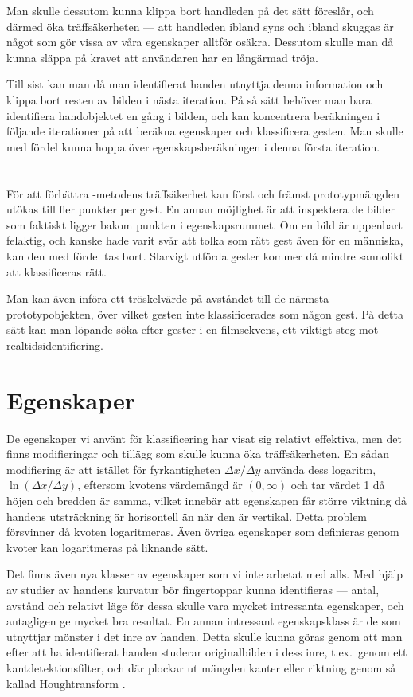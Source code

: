 \documentclass[../rapport_MVEX01-11-05]{subfiles}
\begin{document}
Man skulle dessutom kunna klippa bort handleden på det sätt
 föreslår, och därmed öka träffsäkerheten --- att
handleden ibland syns och ibland skuggas är något som gör vissa av våra
egenskaper alltför osäkra. Dessutom skulle man då kunna släppa på kravet
att användaren har en långärmad tröja.

Till sist kan man då man identifierat handen utnyttja denna information och
klippa bort resten av bilden i nästa iteration. På så sätt behöver man bara
identifiera handobjektet en gång i bilden, och kan koncentrera beräkningen
i följande iterationer på att beräkna egenskaper och klassificera gesten.
Man skulle med fördel kunna hoppa över egenskapsberäkningen i denna första
iteration.

\section{\knn}
För att förbättra \knn-metodens träffsäkerhet kan först och
främst prototypmängden utökas till fler punkter per gest. En annan
möjlighet är att inspektera de bilder som faktiskt ligger bakom
punkten i egenskapsrummet. Om en bild är uppenbart felaktig, och kanske hade varit
svår att tolka som rätt gest även för en människa, kan den med fördel tas bort.
Slarvigt utförda gester kommer då mindre sannolikt att
klassificeras rätt.

Man kan även införa ett tröskelvärde på avståndet till de närmsta
prototypobjekten, över vilket gesten inte klassificerades som någon
gest. På detta sätt kan man löpande söka efter gester
i en filmsekvens, ett viktigt steg mot
realtidsidentifiering.

\section{Egenskaper}
De egenskaper vi använt för klassificering har visat sig relativt
effektiva, men det finns modifieringar och tillägg som skulle kunna
öka träffsäkerheten.
En sådan modifiering är att istället för fyrkantigheten $\Delta
x/\Delta y$ använda dess logaritm, $\ln(\Delta x/\Delta
y)$, eftersom kvotens värdemängd är $(0,\infty)$ och tar värdet 1 då
höjen och bredden är samma, vilket innebär att egenskapen får större
viktning då handens utsträckning är horisontell än när den är vertikal. Detta problem
försvinner då kvoten logaritmeras. Även övriga egenskaper som
definieras genom kvoter kan logaritmeras på liknande sätt.

Det finns även nya klasser av egenskaper som vi inte arbetat med
alls. Med hjälp av studier av handens kurvatur bör fingertoppar kunna
identifieras --- antal, avstånd och relativt läge för dessa skulle vara
mycket intressanta egenskaper, och antagligen ge mycket bra resultat.
En annan intressant egenskapsklass är de som utnyttjar mönster i det
inre av handen. Detta skulle kunna göras
genom att man efter att ha identifierat handen studerar originalbilden i dess
inre, t.ex.~genom ett kantdetektionsfilter, och där plockar ut mängden
kanter eller riktning genom så kallad Houghtransform \cite[s.~23]{Rudemo09}.
\end{document}
